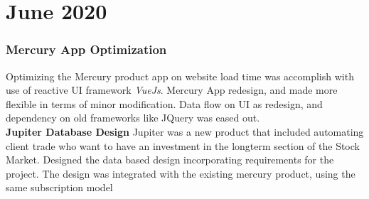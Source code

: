 \section{June 2020}
\subsubsection{Mercury App Optimization}
Optimizing the Mercury product app on website load time was accomplish with use of reactive UI framework \textit{VueJs}. Mercury App redesign, and made more flexible in terms of minor modification. Data flow on UI as redesign, and dependency on old frameworks like JQuery was eased out.\\
\textbf{Jupiter Database Design}
Jupiter was a new product that included automating client trade who want to have an investment in the longterm section of the Stock Market. Designed the data based design incorporating requirements for the project. The design was integrated with the existing mercury product, using the same subscription model
